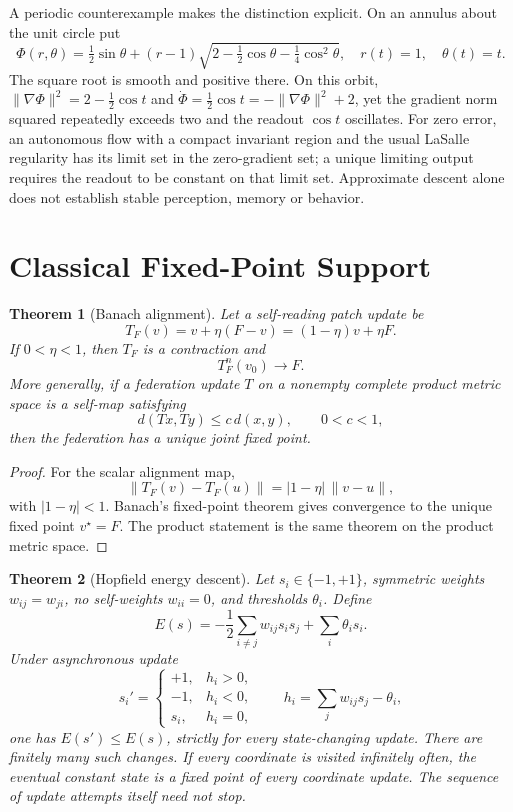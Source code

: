 \documentclass[11pt]{article}
\newtheorem{theorem}{Theorem}[section]
\theoremstyle{remark}
\theoremstyle{plain}
\begin{document}
A periodic counterexample makes the distinction explicit. On an annulus
about the unit circle put
\[
\Phi(r,\theta)=\tfrac12\sin\theta+
(r-1)\sqrt{2-\tfrac12\cos\theta-\tfrac14\cos^2\theta},
\quad r(t)=1,\quad\theta(t)=t.
\]
The square root is smooth and positive there. On this orbit,
\(\|\nabla\Phi\|^2=2-\tfrac12\cos t\) and
\(\dot\Phi=\tfrac12\cos t=-\|\nabla\Phi\|^2+2\), yet the gradient
norm squared repeatedly exceeds two and the readout \(\cos t\) oscillates.
For zero error, an autonomous flow with a compact invariant region and the
usual LaSalle regularity has its limit set in the zero-gradient set; a
unique limiting output requires the readout to be constant on that
limit set. Approximate descent alone does not establish stable perception,
memory or behavior.

\section{Classical Fixed-Point Support}

\begin{theorem}[Banach alignment]
Let a self-reading patch update be
\[
T_F(v)=v+\eta(F-v)=(1-\eta)v+\eta F.
\]
If \(0<\eta<1\), then \(T_F\) is a contraction and
\[
T_F^n(v_0)\to F.
\]
More generally, if a federation update \(T\) on a nonempty complete product metric space is a self-map satisfying
\[
d(Tx,Ty)\le c\,d(x,y),
\qquad 0<c<1,
\]
then the federation has a unique joint fixed point.
\end{theorem}

\begin{proof}
For the scalar alignment map,
\[
\|T_F(v)-T_F(u)\|=|1-\eta|\,\|v-u\|,
\]
with \(|1-\eta|<1\). Banach's fixed-point theorem gives convergence to the unique fixed point \(v^\star=F\). The product statement is the same theorem on the product metric space.
\end{proof}

\begin{theorem}[Hopfield energy descent]
Let \(s_i\in\{-1,+1\}\), symmetric weights \(w_{ij}=w_{ji}\), no self-weights \(w_{ii}=0\), and thresholds \(\theta_i\). Define
\[
E(s)=
-\frac12\sum_{i\ne j}w_{ij}s_i s_j
+\sum_i\theta_i s_i.
\]
Under asynchronous update
\[
s_i'=\begin{cases}
+1,&h_i>0,\\
-1,&h_i<0,\\
s_i,&h_i=0,
\end{cases}
\qquad h_i=\sum_jw_{ij}s_j-\theta_i,
\]
one has \(E(s')\le E(s)\), strictly for every state-changing update.
There are finitely many such changes. If every coordinate is visited
infinitely often, the eventual constant state is a fixed point of every
coordinate update. The sequence of update attempts itself need not stop.
\end{theorem}
\end{document}
